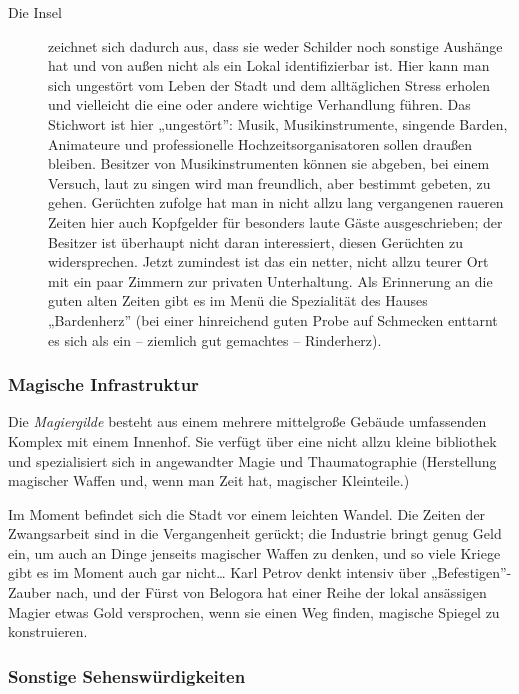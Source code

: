 \documentclass[a4paper,10pt]{scrartcl}
\begin{document}
\begin{description}
\item[Die Insel] zeichnet sich dadurch aus, dass sie weder Schilder noch
  sonstige Aushänge hat und von außen nicht als ein Lokal
  identifizierbar ist. Hier kann man sich ungestört vom Leben der Stadt
  und dem alltäglichen Stress erholen und vielleicht die eine oder
  andere wichtige Verhandlung führen. Das Stichwort ist hier
  „ungestört”: Musik, Musikinstrumente, singende Barden, Animateure und
  professionelle Hochzeitsorganisatoren sollen draußen bleiben. Besitzer
  von Musikinstrumenten können sie abgeben, bei einem Versuch, laut zu
  singen wird man freundlich, aber bestimmt gebeten, zu gehen. Gerüchten
  zufolge hat man in nicht allzu lang vergangenen raueren Zeiten hier
  auch Kopfgelder für besonders laute Gäste ausgeschrieben; der Besitzer
  ist überhaupt nicht daran interessiert, diesen Gerüchten zu
  widersprechen. Jetzt zumindest ist das ein netter, nicht allzu teurer
  Ort mit ein paar Zimmern zur privaten Unterhaltung. Als Erinnerung an
  die guten alten Zeiten gibt es im Menü die Spezialität des Hauses
  „Bardenherz” (bei einer hinreichend guten Probe auf Schmecken enttarnt
  es sich als ein -- ziemlich gut gemachtes -- Rinderherz).
\end{description}

\subsubsection{Magische Infrastruktur}

Die \emph{Magiergilde} besteht aus einem mehrere mittelgroße Gebäude
umfassenden Komplex mit einem Innenhof. Sie verfügt über eine nicht
allzu kleine bibliothek und spezialisiert sich in angewandter Magie und
Thaumatographie (Herstellung magischer Waffen und, wenn man Zeit hat,
magischer Kleinteile.)

Im Moment befindet sich die Stadt vor einem leichten Wandel. Die Zeiten
der Zwangsarbeit sind in die Vergangenheit gerückt; die Industrie bringt
genug Geld ein, um auch an Dinge jenseits magischer Waffen zu denken,
und so viele Kriege gibt es im Moment auch gar nicht… Karl Petrov denkt
intensiv über „Befestigen”-Zauber nach, und der Fürst von Belogora hat
einer Reihe der lokal ansässigen Magier etwas Gold versprochen, wenn sie
einen Weg finden, magische Spiegel zu konstruieren.

\subsubsection{Sonstige Sehenswürdigkeiten}
\end{document}
